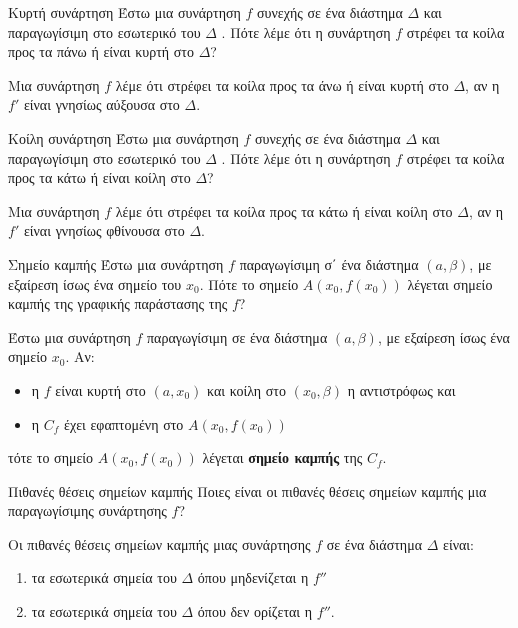 \begin{Orismosbox}{Κυρτή συνάρτηση}
\label{orismos:kyrth_synarthsh}
Έστω μια συνάρτηση $f$ συνεχής σε ένα διάστημα $\Delta$ και παραγωγίσιμη στο εσωτερικό του
$\Delta$ . Πότε λέμε ότι η συνάρτηση $f$ στρέφει τα κοίλα προς τα πάνω ή είναι κυρτή στο $\Delta$?
\end{Orismosbox}
\apanthsh
Μια συνάρτηση $ f $ λέμε ότι στρέφει τα κοίλα προς τα άνω ή είναι κυρτή στο $ \Delta $, αν η $ f' $ είναι γνησίως αύξουσα στο $ \Delta $.
\begin{Orismosbox}{Κοίλη συνάρτηση}
\label{orismos:koilh_synarthsh}
Έστω μια συνάρτηση $f$ συνεχής σε ένα διάστημα $\Delta$ και παραγωγίσιμη στο εσωτερικό του
$\Delta$ . Πότε λέμε ότι η συνάρτηση $f$ στρέφει τα κοίλα προς τα κάτω ή είναι κοίλη στο $\Delta$?
\end{Orismosbox}
\apanthsh
Μια συνάρτηση $ f $ λέμε ότι στρέφει τα κοίλα προς τα κάτω ή είναι κοίλη στο $ \Delta $, αν η $ f' $ είναι γνησίως φθίνουσα στο $ \Delta $.
\begin{Orismosbox}{Σημείο καμπής}
\label{orismos:shmeio_kamphs}
Έστω μια συνάρτηση $f$ παραγωγίσιμη σ΄ ένα διάστημα $(a,\beta)$, με εξαίρεση ίσως ένα σημείο
του $x_0$. Πότε το σημείο $A(x_0,f(x_0))$ λέγεται σημείο καμπής της γραφικής παράστασης της
$f$?
\end{Orismosbox}
\apanthsh
Έστω μια συνάρτηση $ f $ παραγωγίσιμη σε ένα διάστημα $ (a,\beta) $, με εξαίρεση ίσως ένα σημείο $ x_0 $. Αν:
\begin{itemize}[itemsep=0mm]
\item η $ f $ είναι κυρτή στο $ (a,x_0) $ και κοίλη στο $ (x_0,\beta) $ η αντιστρόφως και
\item η $ C_f $ έχει εφαπτομένη στο $ A(x_0,f(x_0)) $
\end{itemize}
τότε το σημείο $ A(x_0,f(x_0)) $ λέγεται \textbf{σημείο καμπής} της $ C_f $.
\begin{Orismosbox}{Πιθανές θέσεις σημείων καμπής}
\label{orismos:pithanes_theseis_shmeiwn_kamphs}
Ποιες είναι οι πιθανές θέσεις σημείων καμπής μια παραγωγίσιμης συνάρτησης $f$?
\end{Orismosbox}
\apanthsh
Οι πιθανές θέσεις σημείων καμπής μιας συνάρτησης $f$ σε ένα διάστημα $\varDelta$ είναι:
\begin{enumerate}
\item τα εσωτερικά σημεία του $\varDelta$ όπου μηδενίζεται η $f''$
\item τα εσωτερικά σημεία του $\varDelta$ όπου δεν ορίζεται η $f''$.
\end{enumerate}
